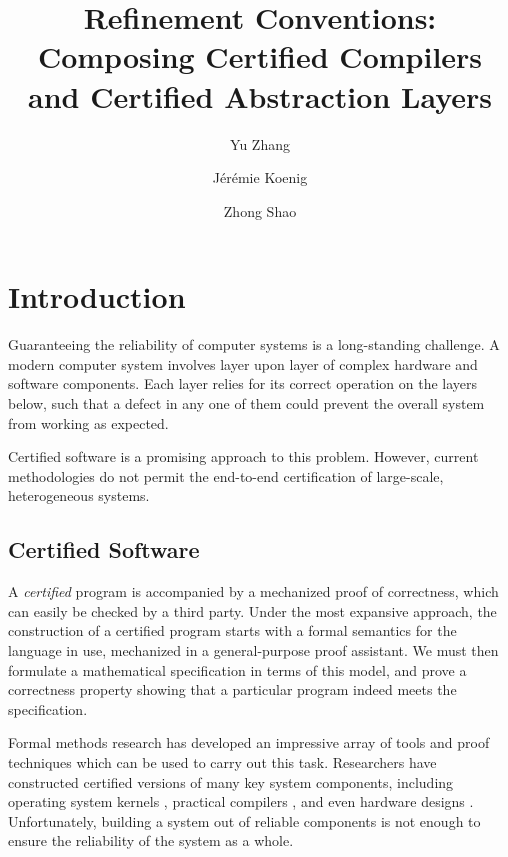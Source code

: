 \documentclass[acmsmall,review,anonymous]{acmart}\settopmatter{printfolios=true,printccs=false,printacmref=false}
\title{%
  Refinement Conventions:
  Composing Certified Compilers and Certified Abstraction Layers}
\author{Yu Zhang}
\affiliation{
  \institution{Yale University}
  \city{New Haven}
  \state{CT}
  \country{USA}}
\author{J\'er\'emie Koenig}
\affiliation{
  \institution{Yale University}
  \city{New Haven}
  \state{CT}
  \country{USA}}
\author{Zhong Shao}
\affiliation{
  \institution{Yale University}
  \city{New Haven}
  \state{CT}
  \country{USA}}
\begin{document}
\maketitle

\section{Introduction} %

Guaranteeing the reliability of computer systems
is a long-standing challenge.
A modern computer system involves
layer upon layer of complex hardware and software components.
Each layer relies for its correct operation
on the layers below,
such that a defect in any one of them
could prevent the overall system from
working as expected.

Certified software is a promising approach
to this problem.
However,
current methodologies do not permit
the end-to-end certification of
large-scale, heterogeneous systems.

\subsection{Certified Software}


A \emph{certified} program is accompanied by
a mechanized proof of correctness,
which can easily be checked by a third party.
Under the most expansive approach,
the construction of a certified program
starts with a formal semantics 
for the language in use,
mechanized in a general-purpose proof assistant.
We must then formulate a mathematical specification
in terms of this model,
and prove a correctness property
showing that a particular program indeed meets the specification.

Formal methods research
has developed an impressive array of
tools and proof techniques
which can be used to carry out this task.
Researchers have constructed
certified versions of many key system components,
including
operating system kernels \cite{sel4,popl15},
practical compilers \cite{compcert},
and even hardware designs \cite{kami}.
Unfortunately,
building a system out of reliable components
is not enough to ensure
the reliability of the system as a whole.
\end{document}
